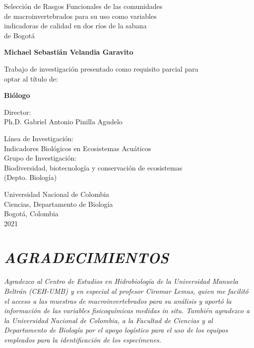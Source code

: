 	\begin{center}
	\vspace{0.8cm}
	\LARGE
	Selección de Rasgos Funcionales de las comunidades \\
	de macroinvertebrados para su uso como variables \\
	indicadoras de  calidad en dos ríos de la sabana \\
	de Bogotá
	
	\vspace{0.8cm}
	\Large
	\textbf{Michael Sebastián Velandia Garavito}
	
	\vspace{2.7cm}	
    \normalsize
	Trabajo de investigación presentado como requisito parcial para \\
	optar al título de: 
	
	\vspace{0.2cm}
	\normalsize
	\textbf{Biólogo}
    
	\vspace{1cm}
	\normalsize
	Director:\\
    Ph.D. Gabriel Antonio Pinilla Agudelo

	\vspace{1.3cm}
	\normalsize
	Línea de Investigación:\\
    Indicadores Biológicos en Ecosistemas Acuáticos\\
    Grupo de Investigación:\\
    Biodiversidad, biotecnología y conservación de ecosistemas\\ 
    (Depto. Biología)


	\vspace{1.3cm}
	\normalsize
	Universidad Nacional de Colombia\\
    Ciencias, Departamento de Biología\\
    Bogotá, Colombia\\
    2021\\

	\vspace{1.5cm}
	\end{center}

\newpage
\thispagestyle{empty}
    
\section*{\textit{AGRADECIMIENTOS}}
\thispagestyle{empty}

    \vspace{3cm}
    \textit{Agradezco al Centro de Estudios en Hidrobiología de la Universidad Manuela 
    Beltrán (CEH-UMB) y en especial al profesor Ciromar Lemus, quien me facilitó
    el acceso a las muestras de macroinvertebrados para su análisis y aportó la
    información de las variables fisicoquímicas medidas in situ. También agradezco
    a la Universidad Nacional de Colombia, a la Facultad de Ciencias y al Departamento
    de Biología  por el apoyo logístico para el uso de los equipos empleados para
    la identificación de los especímenes.}
    
